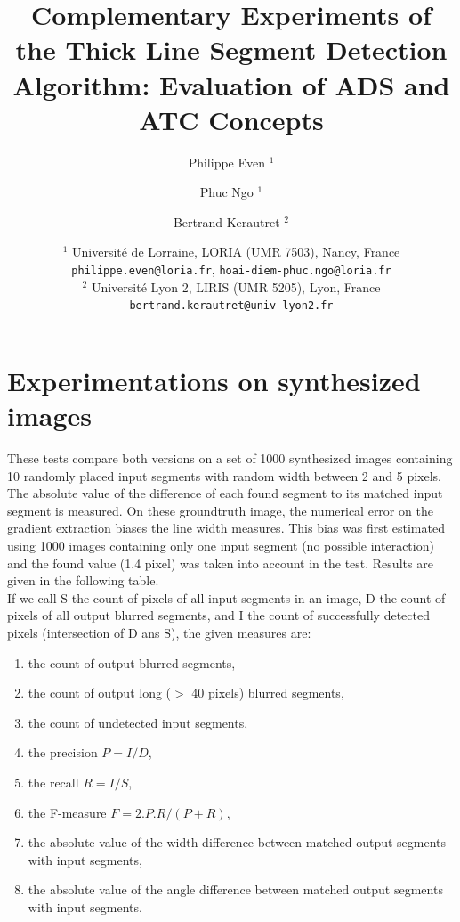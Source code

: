 \documentclass[11pt]{article}
\title{Complementary Experiments of the Thick Line Segment Detection Algorithm: Evaluation of ADS and ATC Concepts}
\date{
  $^1$ Universit\'e de Lorraine, LORIA (UMR 7503), Nancy, France \\
  \texttt{philippe.even@loria.fr},
  \texttt{hoai-diem-phuc.ngo@loria.fr}\\
  $^2$  Universit\'e Lyon 2, LIRIS (UMR 5205), Lyon, France\\
  \texttt{bertrand.kerautret@univ-lyon2.fr}}
\author{Philippe Even $^1$ \and Phuc Ngo $^1$ \and Bertrand Kerautret $^2$}
\begin{document}
\maketitle







\section{Experimentations on synthesized images}
These tests compare both versions on a set of 1000 synthesized images containing
10 randomly placed input segments with random width between 2 and 5 pixels.
The absolute value of the difference of each found segment to its matched input segment is measured.
On these groundtruth image, the numerical error on the gradient extraction biases the line width measures.
This bias was first estimated using 1000 images containing only one input segment (no possible interaction) and the found value (1.4 pixel) was taken into account in the test.
Results are given in the following table. \\

If we call S the count of pixels of all input segments in an image,
D the count of pixels of all output blurred segments,
and I the count of successfully detected pixels (intersection of D ans S),
the given measures are:
\begin{enumerate}
\item the count of output blurred segments,
\item the count of output long ($>$ 40 pixels) blurred segments,
\item the count of undetected input segments,
\item the precision $P = I/D$,
\item the recall $R = I/S$,
\item the F-measure $F = 2.P.R / (P+R)$,
\item the absolute value of the width difference between matched output segments with input segments,
\item the absolute value of the angle difference between matched output segments with input segments.
\end{enumerate}
\end{document}

